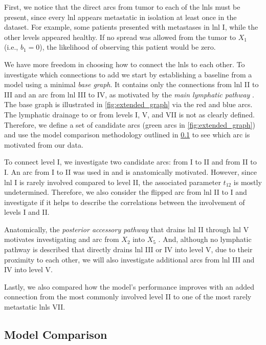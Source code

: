 \documentclass[twocolumn]{aastex631}
\begin{document}
First, we notice that the direct arcs from tumor to each of the \glspl{lnl} must be present, since every \gls{lnl} appears metastatic in isolation at least once in the dataset. For example, some patients presented with metastases in \gls{lnl} I, while the other levels appeared healthy. If no spread was allowed from the tumor to $X_1$ (i.e., $b_1 = 0$), the likelihood of observing this patient would be zero.

We have more freedom in choosing how to connect the \glspl{lnl} to each other. To investigate which connections to add we start by establishing a baseline from a model using a minimal \emph{base graph}. It contains only the connections from \gls{lnl} II to III and an arc from \gls{lnl} III to IV, as motivated by the \emph{main lymphatic pathway} \cite{lengele_anatomical_2007}. The base graph is illustrated in \cref{fig:extended_graph} via the red and blue arcs. The lymphatic drainage to or from levels I, V, and VII is not as clearly defined. Therefore, we define a set of candidate arcs (green arcs in \cref{fig:extended_graph}) and use the model comparison methodology outlined in \cref{subsec:complete_model:comparison} to see which arc is motivated from our data. 

To connect level I, we investigate two candidate arcs: from I to II and from II to I. An arc from I to II was used in \cite{pouymayou_bayesian_2019,ludwig_hidden_2021} and is anatomically motivated. However, since \gls{lnl} I is rarely involved compared to level II, the associated parameter $t_{12}$ is mostly undetermined. Therefore, we also consider the flipped arc from \gls{lnl} II to I and investigate if it helps to describe the correlations between the involvement of levels I and II.

Anatomically, the \emph{posterior accessory pathway} that drains \gls{lnl} II through \gls{lnl} V motivates investigating and arc from $X_2$ into $X_5$ \cite{lengele_anatomical_2007}. And, although no lymphatic pathway is described that directly drains \gls{lnl} III or IV into level V, due to their proximity to each other, we will also investigate additional arcs from \gls{lnl} III and IV into level V.

Lastly, we also compared how the model's performance improves with an added connection from the most commonly involved level II to one of the most rarely metastatic \glspl{lnl} VII.


\subsection{Model Comparison}
\label{subsec:complete_model:comparison}
\end{document}
